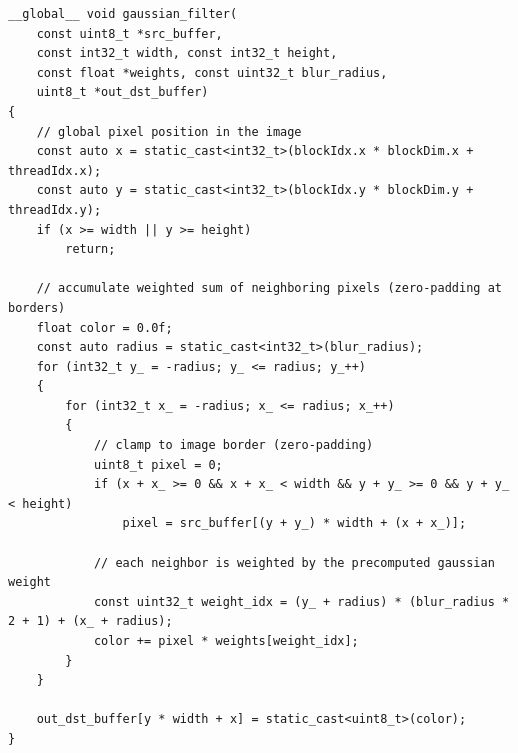 \documentclass[border=8pt]{standalone}
\begin{document}
    \begin{minipage}{20cm}
        \begin{lstlisting}
__global__ void gaussian_filter(
    const uint8_t *src_buffer,
    const int32_t width, const int32_t height,
    const float *weights, const uint32_t blur_radius,
    uint8_t *out_dst_buffer)
{
    // global pixel position in the image
    const auto x = static_cast<int32_t>(blockIdx.x * blockDim.x + threadIdx.x);
    const auto y = static_cast<int32_t>(blockIdx.y * blockDim.y + threadIdx.y);
    if (x >= width || y >= height)
        return;

    // accumulate weighted sum of neighboring pixels (zero-padding at borders)
    float color = 0.0f;
    const auto radius = static_cast<int32_t>(blur_radius);
    for (int32_t y_ = -radius; y_ <= radius; y_++)
    {
        for (int32_t x_ = -radius; x_ <= radius; x_++)
        {
            // clamp to image border (zero-padding)
            uint8_t pixel = 0;
            if (x + x_ >= 0 && x + x_ < width && y + y_ >= 0 && y + y_ < height)
                pixel = src_buffer[(y + y_) * width + (x + x_)];

            // each neighbor is weighted by the precomputed gaussian weight
            const uint32_t weight_idx = (y_ + radius) * (blur_radius * 2 + 1) + (x_ + radius);
            color += pixel * weights[weight_idx];
        }
    }

    out_dst_buffer[y * width + x] = static_cast<uint8_t>(color);
}
        \end{lstlisting}
    \end{minipage}
\end{document}
